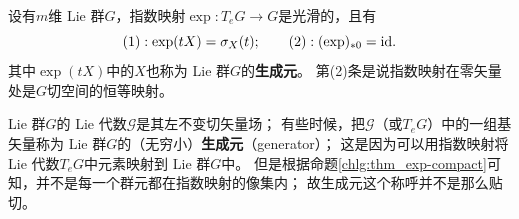 \begin{theorem}\label{chlg:thm_exp-sigma-id}
    设有$m$维 Lie 群$G$，指数映射$\exp : T_e G \to G$是光滑的，且有
    \begin{equation}
        (1): \exp(t X)= \sigma_X(t) ; \qquad
        (2): (\exp)_{*0} = {\rm id} .
    \end{equation}
    其中$\exp(t X)$中的$X$也称为 Lie 群$G$的\textbf{生成元}。
    第(2)条是说指数映射在零矢量处是$G$切空间的恒等映射。
\end{theorem}
 Lie 群$G$的 Lie 代数$\mathscr{G}$是其左不变切矢量场；
有些时候，把$\mathscr{G}$（或$T_eG$）中的一组基矢量称为
 Lie 群$G$的（无穷小）\textbf{生成元}（generator）；        
这是因为可以用指数映射将 Lie 代数$T_eG$中元素映射到 Lie 群$G$中。
但是根据命题\ref{chlg:thm_exp-compact}可知，并不是每一个群元都在指数映射的像集内；
故{\kaishu 生成元}这个称呼并不是那么贴切。

